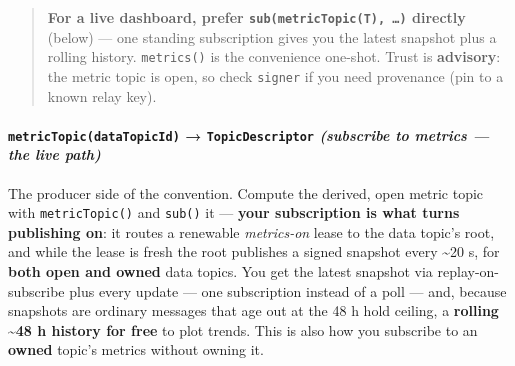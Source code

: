 \documentclass[
  nobib]{tufte-handout}
\newenvironment{Shaded}{}{}
\newcommand{\AttributeTok}[1]{\textcolor[rgb]{0.49,0.56,0.16}{#1}}
\newcommand{\BuiltInTok}[1]{\textcolor[rgb]{0.00,0.50,0.00}{#1}}
\newcommand{\ControlFlowTok}[1]{\textcolor[rgb]{0.00,0.44,0.13}{\textbf{#1}}}
\newcommand{\DataTypeTok}[1]{\textcolor[rgb]{0.56,0.13,0.00}{#1}}
\newcommand{\FunctionTok}[1]{\textcolor[rgb]{0.02,0.16,0.49}{#1}}
\newcommand{\KeywordTok}[1]{\textcolor[rgb]{0.00,0.44,0.13}{\textbf{#1}}}
\newcommand{\NormalTok}[1]{#1}
\newcommand{\OperatorTok}[1]{\textcolor[rgb]{0.40,0.40,0.40}{#1}}
\newcommand{\SpecialCharTok}[1]{\textcolor[rgb]{0.25,0.44,0.63}{#1}}
\newcommand{\StringTok}[1]{\textcolor[rgb]{0.25,0.44,0.63}{#1}}
\newcommand{\VerbatimStringTok}[1]{\textcolor[rgb]{0.25,0.44,0.63}{#1}}
\begin{document}
\begin{Shaded}
\end{Shaded}

\begin{quote}
\textbf{For a live dashboard, prefer \texttt{sub(metricTopic(T),\ …)}
directly} (below) --- one standing subscription gives you the latest
snapshot plus a rolling history. \texttt{metrics()} is the convenience
one-shot. Trust is \textbf{advisory}: the metric topic is open, so check
\texttt{signer} if you need provenance (pin to a known relay key).
\end{quote}

\paragraph{\texorpdfstring{\texttt{metricTopic(dataTopicId)} →
\texttt{TopicDescriptor} \emph{(subscribe to metrics --- the live
path)}}{metricTopic(dataTopicId) → TopicDescriptor (subscribe to metrics --- the live path)}}\label{metrictopicdatatopicid-topicdescriptor-subscribe-to-metrics-the-live-path}

The producer side of the convention. Compute the derived, open metric
topic with \texttt{metricTopic()} and \texttt{sub()} it --- \textbf{your
subscription is what turns publishing on}: it routes a renewable
\emph{metrics-on} lease to the data topic's root, and while the lease is
fresh the root publishes a signed snapshot every \textasciitilde20 s,
for \textbf{both open and owned} data topics. You get the latest
snapshot via replay-on-subscribe plus every update --- one subscription
instead of a poll --- and, because snapshots are ordinary messages that
age out at the 48 h hold ceiling, a \textbf{rolling \textasciitilde48 h
history for free} to plot trends. This is also how you subscribe to an
\textbf{owned} topic's metrics without owning it.
\end{document}

